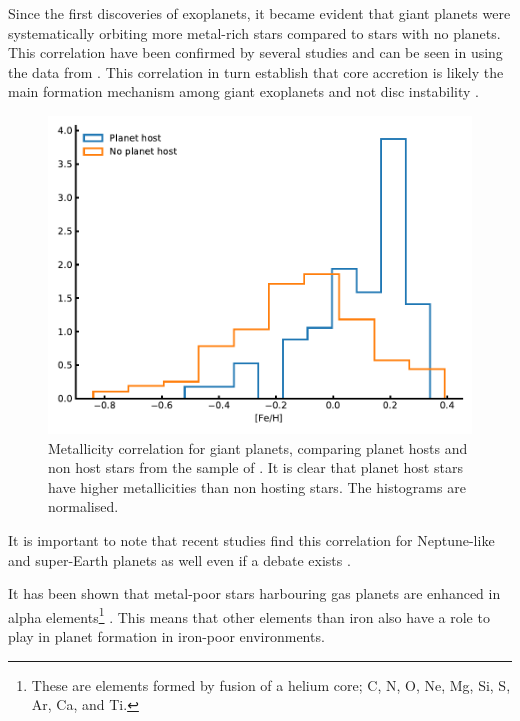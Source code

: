 Since the first discoveries of exoplanets, it became evident that giant planets were systematically
orbiting more metal-rich stars compared to stars with no planets. This correlation have been
confirmed by several studies \citep{Gonzalez1997,Santos2004,Fischer2005,Sousa2008a,Mortier2013b} and
can be seen in  using the data from \citet{Sousa2008a}. This correlation in
turn establish that core accretion is likely the main formation mechanism among giant exoplanets
\citep{Pollack1996,Ida2004,Mordasini2012} and not disc instability \citep{Boss2002}.

\begin{figure}[htpb!]
    \centering
    \includegraphics[width=1.0\linewidth]{figures/fehCorrelation.pdf}
    \caption{Metallicity correlation for giant planets, comparing planet hosts and non host stars
             from the sample of \citet{Sousa2008a}. It is clear that planet host stars have higher
             metallicities than non hosting stars. The histograms are normalised.}
    \label{fig:fehCorrelation}
\end{figure}

It is important to note that recent studies find this correlation for Neptune-like and super-Earth
planets as well \citep{Adibekyan2012a,Wang2015,Zhu2016} even if a debate exists
\citep{Sousa2011,Buchhave2012}.

It has been shown that metal-poor stars harbouring gas planets are enhanced in alpha
elements\footnote{These are elements formed by fusion of a helium core; C, N, O, Ne, Mg, Si, S, Ar,
Ca, and Ti.} \citep[see e.g.][]{Adibekyan2012a}. This means that other elements than iron also have
a role to play in planet formation in iron-poor environments.


